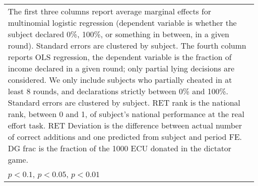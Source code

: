 \begin{tabular}{l|cccccc|cc}
\multicolumn{9}{p{16cm}}{\tiny The first three columns report average marginal effects for multinomial logistic regression (dependent variable is whether the subject declared 0\%, 100\%, or something in between, in a given round). Standard errors are clustered by subject. The fourth column reports OLS regression, the dependent variable is the fraction of income declared in a given round; only partial lying decisions are considered. We only include subjects who partially cheated in at least 8 rounds, and declarations strictly between 0\% and 100\%. Standard errors are clustered by subject. RET rank is the national rank, between 0 and 1, of subject's national performance at the real effort task. RET Deviation is the difference between actual number of correct additions and one predicted from subject and period FE. DG frac is the fraction of the 1000 ECU donated in the dictator game.}\\
\multicolumn{9}{l}{\tiny \sym{*} \(p<0.1\), \sym{**} \(p<0.05\), \sym{***} \(p<0.01\)}\\
\end{tabular}